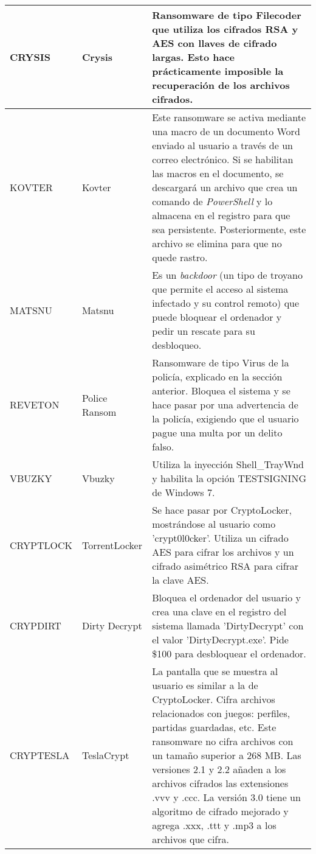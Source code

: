 {\begin{longtable}{|p{}|p{}|p{}|}
    CRYSIS &
    Crysis &
    Ransomware de tipo Filecoder que utiliza los cifrados \gls{RSA} y \gls{AES} con llaves de cifrado largas. Esto hace prácticamente imposible la recuperación de los archivos cifrados. \cite{13}\\
\hline
    KOVTER & 
    Kovter &
    Este ransomware se activa mediante una macro de un documento Word enviado al usuario a través de un correo electrónico. Si se habilitan las macros en el documento, se descargará un archivo que crea un comando de \textit{PowerShell} y lo almacena en el registro para que sea persistente. Posteriormente, este archivo se elimina para que no quede rastro. \cite{14}\\
\hline
     
    MATSNU &
    Matsnu &
    Es un \textit{backdoor} (un tipo de troyano que permite el acceso al sistema infectado y su control remoto) que puede bloquear el ordenador y pedir un rescate para su desbloqueo. \cite{15}\\
\hline
    REVETON & 
    Police Ransom &
    Ransomware de tipo Virus de la policía, explicado en la sección anterior. Bloquea el sistema y se hace pasar por una advertencia de la policía, exigiendo que el usuario pague una multa por un delito falso.\\
\hline
     
    VBUZKY &
    Vbuzky &
    Utiliza la inyección Shell\_TrayWnd y habilita la opción TESTSIGNING de Windows 7.\\
\hline
    CRYPTLOCK & 
    TorrentLocker &
    Se hace pasar por CryptoLocker, mostrándose al usuario como 'crypt0l0cker'. Utiliza un cifrado AES para cifrar los archivos y un cifrado asimétrico \gls{RSA} para cifrar la clave AES. \cite{16}\\
\hline
     
    CRYPDIRT &
    Dirty Decrypt &
    Bloquea el ordenador del usuario y crea una clave en el registro del sistema llamada 'DirtyDecrypt' con el valor 'DirtyDecrypt.exe'. Pide \$100 para desbloquear el ordenador.\\
\hline
    CRYPTESLA & 
    TeslaCrypt &
    La pantalla que se muestra al usuario es similar a la de CryptoLocker. Cifra archivos relacionados con juegos: perfiles, partidas guardadas, etc. Este ransomware no cifra archivos con un tamaño superior a 268 MB. Las versiones 2.1 y 2.2 añaden a los archivos cifrados las extensiones .vvv y .ccc. La versión 3.0 tiene un algoritmo de cifrado mejorado y agrega .xxx, .ttt y .mp3 a los archivos que cifra. \cite{17}\\
\hline
     

\end{longtable}}
